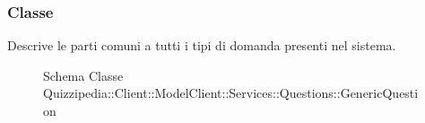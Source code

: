\subsubsection{Classe }
Descrive le parti comuni a tutti i tipi di domanda presenti nel sistema.
\begin{figure}[H]
\centering
\noindent{}
\caption[Schema Classe GenericQuestion]{Schema Classe Quizzipedia::Client::ModelClient::Services::Questions::GenericQuestion}
\end{figure}
